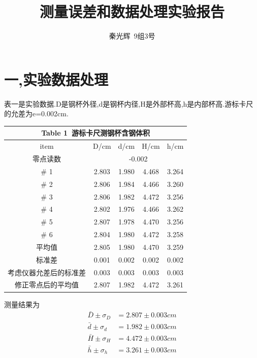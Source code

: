 \documentclass[a4paper,10pt,notitlepage]{report}
\begin{document}
\title{测量误差和数据处理实验报告}
\author{秦光辉\ 9组3号}
\maketitle

\section*{一,实验数据处理}

	表一是实验数据.D是钢杯外径,d是钢杯内径,H是外部杯高,h是内部杯高.游标卡尺的允差为e=0.002cm. \\
	
\begin{table}[htbp]
\centering
	\begin{tabular}{|c|c|c|c|c|}
	
		\multicolumn{5}{c}{Table 1\ 游标卡尺测钢杯含钢体积} \\
		\hline
		item & D/cm & d/cm & H/cm & h/cm \\
		\hline
		零点读数 & \multicolumn{4}{c}{-0.002} \vline \\
		\hline
		\# 1 & 2.803 & 1.980 & 4.468 & 3.264 \\
		\hline
		\# 2 & 2.806 & 1.984 & 4.466 & 3.260 \\
		\hline
		\# 3 & 2.806 & 1.982 & 4.472 & 3.256 \\
		\hline
		\# 4 & 2.802 & 1.976 & 4.466 & 3.262 \\
		\hline
		\# 5 & 2.807 & 1.978 & 4.470 & 3.256 \\
		\hline
		\# 6 & 2.804 & 1.980 & 4.472 & 3.258 \\
		\hline
		平均值 & 2.805 & 1.980 & 4.470 & 3.259 \\
		\hline
		标准差 & 0.001 & 0.002 & 0.002 & 0.002 \\
		\hline
		考虑仪器允差后的标准差 & 0.003 & 0.003 & 0.003 & 0.003\\
		\hline
		修正零点后的平均值 & 2.807 & 1.982 & 4.472 & 3.261\\
		\hline

	\end{tabular}
\end{table}

	测量结果为 \\
	
\begin{align}
	\bar{D} \pm \sigma_{D} &= 2.807 \pm 0.003 cm \\
	\bar{d} \pm \sigma_{d} &= 1.982 \pm 0.003 cm \\
	\bar{H} \pm \sigma_{H} &= 4.472 \pm 0.003 cm \\
	\bar{h} \pm \sigma_{h} &= 3.261 \pm 0.003 cm
\end{align}
\end{document}

